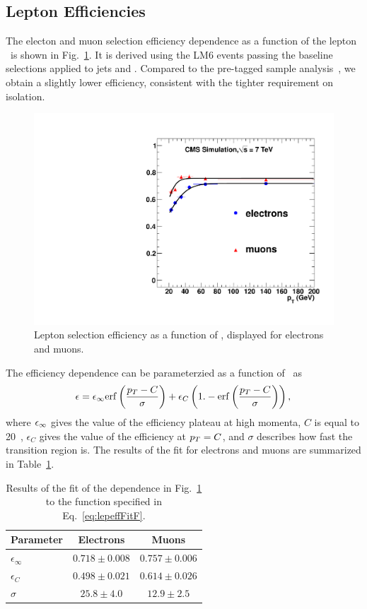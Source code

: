 \subsection{Lepton Efficiencies}
\label{sec:lepeff}
%
The electon and muon selection efficiency dependence as a function of the lepton \pt\
is shown in Fig.~\ref{fig:lepeffLM6}.
It is derived using the LM6 events passing the baseline selections applied to jets and \met.
Compared to the pre-tagged sample analysis~\cite{ssnote2011}, we obtain a slightly
lower efficiency, consistent with the tighter requirement on isolation.

\begin{figure}[h]
\begin{center}
\includegraphics[width=0.7\linewidth]{figs/leptonEfficiency_lm6}
\caption{\label{fig:lepeffLM6}
Lepton selection efficiency as a function of \pt,
displayed for electrons and muons.
}
\end{center}
\end{figure}

%
The efficiency dependence can be parameterzied as a function of \pt\ as 
%
\begin{eqnarray}
\epsilon = \epsilon_{\rm \infty} {\rm erf}\left ( \frac{p_T - C}{\sigma} \right)
	+ \epsilon_C \left( 1.- {\rm erf}\left ( \frac{p_T - C}{\sigma} \right) \right),
\label{eq:lepeffFitF}
\end{eqnarray}
where $\epsilon_{\rm \infty}$ gives the value of the efficiency plateau at high momenta,
$C$ is equal to 20~\GeV,
$\epsilon_C$ gives the value of the efficiency at $p_T=C$,
and $\sigma$ describes how fast the transition region is.
The results of the fit for electrons and muons are summarized in Table~\ref{tab:lepeffLM6fit}.
%
\begin{table}[h]
\begin{center}
\caption{\label{tab:lepeffLM6fit} Results of the fit of the dependence in Fig.~\ref{fig:lepeffLM6}
to the function specified in Eq.~\ref{eq:lepeffFitF}.}
\begin{tabular}{l|cc}\hline\hline
Parameter		& Electrons		& Muons			\\ \hline
$\epsilon_{\infty}$	& $0.718\pm0.008$	& $0.757\pm0.006$	\\
$\epsilon_{C}$		& $0.498\pm0.021$	& $0.614\pm0.026$	\\
$\sigma$		& $25.8\pm4.0$		& $12.9\pm2.5$		\\
\hline\hline
\end{tabular}
\end{center}
\end{table}


